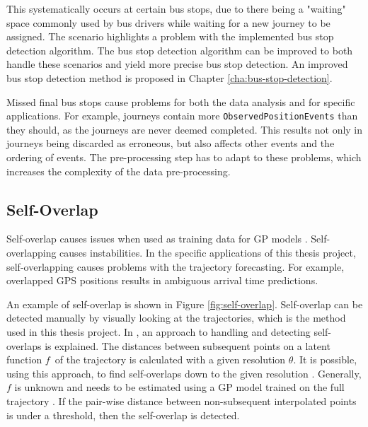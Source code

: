 This systematically occurs at certain bus stops, due to there being a "waiting" space commonly used by bus drivers while waiting for a new journey to be assigned.
The scenario highlights a problem with the implemented bus stop detection algorithm.
The bus stop detection algorithm can be improved to both handle these scenarios and yield more precise bus stop detection.
An improved bus stop detection method is proposed in Chapter \ref{cha:bus-stop-detection}.

Missed final bus stops cause problems for both the data analysis and for specific applications.
For example, journeys contain more \texttt{ObservedPositionEvents} than they should, as the journeys are never deemed completed.
This results not only in journeys being discarded as erroneous, but also affects other events and the ordering of events.
The pre-processing step has to adapt to these problems, which increases the complexity of the data pre-processing.

\subsection{Self-Overlap} \label{sec:self-overlapping-trajectories}

Self-overlap causes issues when used as training data for GP models \cite{Tiger2018-gp-motion-pattern}.
Self-overlapping causes instabilities.
In the specific applications of this thesis project, self-overlapping causes problems with the trajectory forecasting.
For example, overlapped GPS positions results in ambiguous arrival time predictions.

An example of self-overlap is shown in Figure \ref{fig:self-overlap}.
Self-overlap can be detected manually by visually looking at the trajectories, which is the method used in this thesis project.
In \cite{Tiger2018-gp-motion-pattern}, an approach to handling and detecting self-overlaps is explained.
The distances between subsequent points on a latent function $f$ of the trajectory is calculated with a given resolution $\theta$.
It is possible, using this approach, to find self-overlaps down to the given resolution \cite{Tiger2018-gp-motion-pattern}.
Generally, $f$ is unknown and needs to be estimated using a GP model trained on the full trajectory \cite{Tiger2018-gp-motion-pattern}.
If the pair-wise distance between non-subsequent interpolated points is under a threshold, then the self-overlap is detected.   

